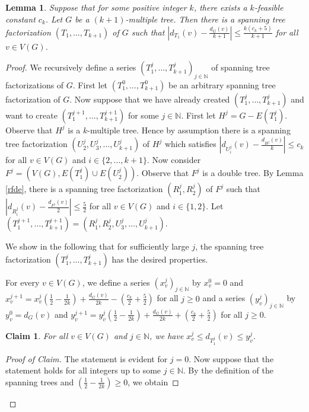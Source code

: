 \documentclass{article}
\theoremstyle{plain}
\newtheorem{Lemma}{Lemma}
\newtheorem{Claim}{Claim}
\theoremstyle{nonumberplain}
\theoremstyle{nonumberplain}
\newcommand{\stf}{spanning tree factorization }
\begin{document}
\begin{Lemma}\label{baum}
Suppose that for some positive integer $k$, there exists a $k$-feasible constant $c_k$. Let $G$ be a $(k+1)$-multiple tree. Then there is a \stf $(T_1,\ldots,T_{k+1})$ of $G$ such that $|d_{T_1}(v)-\frac{d_G(v)}{k+1}|\leq \frac{k(c_k+5)}{k+1}$ for all $v \in V(G)$.
\end{Lemma}
\begin{proof}
We recursively define a series $(T_1^{j},\ldots,T_{k+1}^{j})_{j \in \mathbb{N}}$ of spanning tree factorizations of $G$. First let $(T_1^{0},\ldots,T_{k+1}^{0})$ be an arbitrary \stf of $G$. Now suppose that we have already created $(T_1^{j},\ldots,T_{k+1}^{j})$ and want to create $(T_1^{j+1},\ldots,T_{k+1}^{j+1})$ for some $j \in \mathbb{N}$. First let $H^{j}=G-E(T_1^{j})$. Observe that $H^{j}$ is a $k$-multiple tree. Hence by assumption there is a spanning tree factorization $(U_2^{j},U_3^{j},\ldots,U_{k+1}^{j})$ of $H^{j}$ which satisfies $|d_{U_i^{j}}(v)-\frac{d_{H^{j}}(v)}{k}|\leq c_k$ for all $v \in V(G)$ and $i \in \{2,\ldots,k+1\}$. Now consider $F^{j}=(V(G),E(T_1^{j})\cup E(U_2^{j}))$. Observe that $F^{j}$ is a double tree. By Lemma \ref{rfde}, there is a \stf $(R_1^{j},R_2^{j})$ of $F^{j}$ such that $|d_{R_i^{j}}(v)-\frac{d_{F^{j}}(v)}{2}|\leq \frac{5}{2}$ for all $v \in V(G)$ and $i \in \{1,2\}$. Let $(T_1^{j+1},\ldots,T_{k+1}^{j+1})=(R_1^{j},R_2^{j},U_3^{j},\ldots,U_{k+1}^{j})$.
\medskip

We show in the following that for sufficiently large $j$, the \stf $(T_1^{j},\ldots,T_{k+1}^{j})$ has the desired properties.

For every $v \in V(G)$, we define a series $(x_v^{j})_{j \in \mathbb{N}}$ by $x_v^0=0$ and $x_v^{j+1}=x_v^j(\frac{1}{2}-\frac{1}{2k})+\frac{d_G(v)}{2k}-(\frac{c_k}{2}+\frac{5}{2})$ for all $j \geq 0$ and a series $(y_v^{j})_{j \in \mathbb{N}}$ by $y_v^0=d_G(v)$ and $y_v^{j+1}=y_v^j(\frac{1}{2}-\frac{1}{2k})+\frac{d_G(v)}{2k}+(\frac{c_k}{2}+\frac{5}{2})$ for all $j \geq 0$.

\begin{Claim}\label{gzuzugzu}
For all $v \in V(G)$ and $j \in \mathbb{N}$, we have $x_v^{j}\leq d_{T_1^{j}}(v)\leq y_v^{j}$.
\end{Claim}
\begin{proof}[Proof of Claim]
The statement is evident for $j=0$. Now suppose that the statement holds for all integers up to some $j \in \mathbb{N}$. By the definition of the spanning trees and $(\frac{1}{2}-\frac{1}{2k})\geq 0$, we obtain


\end{proof}
\end{proof}
\end{document}
